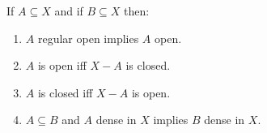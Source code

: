 If $A \subseteq X$ and if $B \subseteq X$ then:
\begin{enumerate}
\item $A$ regular open implies $A$ open.
\item $A$ is open iff $X - A$ is closed.
\item $A$ is closed iff $X - A$ is open.
\item $A \subseteq B$ and $A$ dense in $X$ implies $B$ dense in $X$.
\end{enumerate}
